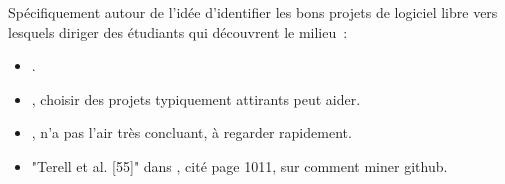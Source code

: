 
Spécifiquement autour de l'idée d'identifier les bons projets de logiciel libre vers lesquels diriger des
étudiants qui découvrent le milieu :

\begin{itemize}
    \item {}.
    \item {}, choisir des projets typiquement attirants peut aider.
    \item {}, n'a pas l'air très concluant, à regarder rapidement.
    \item "Terell et al. [55]" dans \textcite{barriers-2018}, cité page 1011, sur comment miner \gls{github}.
\end{itemize}
